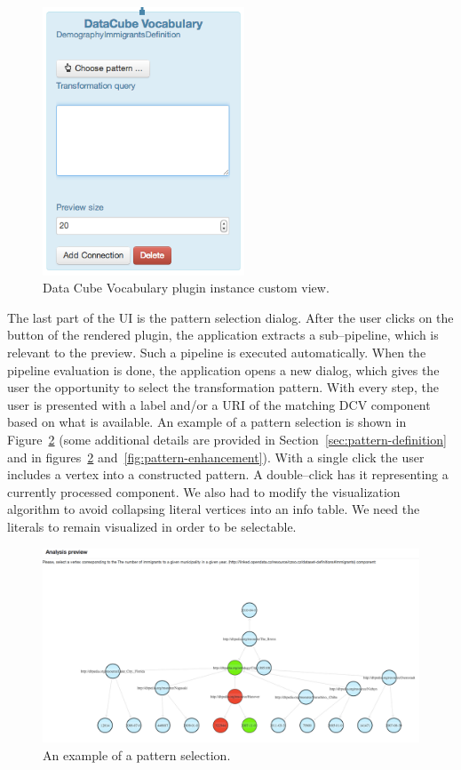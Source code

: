 \begin{figure}
	\centering
	\includegraphics[width=60mm]{img/custom-dcv-piv.png}
	\caption{Data Cube Vocabulary plugin instance custom view.}
	\label{fig:DCV-plugin-view}
\end{figure}

The last part of the UI is the pattern selection dialog. After the user clicks 
on the button of the rendered plugin, the application extracts a sub--pipeline, 
which is relevant to the preview. Such a pipeline is executed
automatically. When the pipeline evaluation is done, the application opens a new 
dialog, which gives the user the opportunity to select the transformation 
pattern. With every step, the user is presented with a label and/or a URI of the 
matching DCV component based on what is available. An example of a pattern 
selection is shown in Figure~\ref{fig:pattern-selection} (some additional details are provided
in Section~\ref{sec:pattern-definition}
and in figures~\ref{fig:pattern-selection} and~\ref{fig:pattern-enhancement}).
With a single click 
the user includes a vertex into a constructed pattern. A double--click 
has it representing a currently processed component. We also had to modify the 
visualization algorithm to avoid collapsing literal vertices into an info table. 
We need the literals to remain visualized in order to be selectable.

\begin{figure}
	\centering
	\includegraphics[width=140mm]{img/pattern-selection.png}
	\caption{An example of a pattern selection.}
	\label{fig:pattern-selection}
\end{figure}

